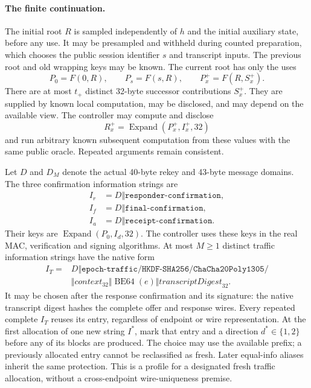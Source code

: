 \paragraph{The finite continuation.}
The initial root $R$ is sampled independently of $h$ and the initial
auxiliary state, before any use. It may be presampled and withheld during
counted preparation, which chooses the public session identifier $s$ and
transcript inputs. The previous root and old wrapping keys may be known.
The current root has only the uses
\begin{equation}
 P_0=F(0,R),\qquad P_s=F(s,R),\qquad P_x^+=F(R,S_x^+).
 \label{eq:joint-root-uses}
\end{equation}
There are at most $t_+$ distinct 32-byte successor contributions $S_x^+$.
They are supplied by known local computation, may be disclosed, and may
depend on the available view. The controller may compute and disclose
\[
 R_x^+=\operatorname{Expand}(P_x^+,I_x^+,32)
\]
and run arbitrary known subsequent computation from these values with the
same public oracle. Repeated arguments remain consistent.

Let $D$ and $D_M$ denote the actual 40-byte rekey and 43-byte message domains.
The three confirmation information strings are
\[
\begin{aligned}
 I_r&=D\Vert\texttt{responder-confirmation},\\
 I_f&=D\Vert\texttt{final-confirmation},\\
 I_a&=D\Vert\texttt{receipt-confirmation}.
\end{aligned}
\]
Their keys are $\operatorname{Expand}(P_0,I_d,32)$. The controller uses
these keys in the real MAC, verification and signing algorithms.
At most $M\ge1$ distinct traffic information strings have the native form
\begin{equation}
\begin{split}
 I_T={}&D\Vert\texttt{epoch-traffic/HKDF-SHA256/ChaCha20Poly1305/}\\
 &\Vert\mathit{context}_{32}\Vert\operatorname{BE64}(e)
 \Vert\mathit{transcriptDigest}_{32}.
\end{split}
 \label{eq:joint-traffic-info}
\end{equation}
It may be chosen after the response confirmation and its signature: the
native transcript digest hashes the complete offer and response wires.
Every repeated complete $I_T$ reuses its entry, regardless of endpoint or
wire representation. At the first allocation of one new string $I^*$,
mark that entry and a direction $d^*\in\{1,2\}$ before any of its blocks
are produced. The choice may use the available prefix; a previously
allocated entry cannot be reclassified as fresh. Later equal-info
aliases inherit the same protection. This is a profile for a designated
fresh traffic allocation, without a cross-endpoint wire-uniqueness premise.

